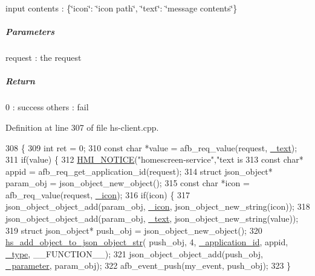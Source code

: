 input contents \+: \{\char`\"{}icon\char`\"{}\+: \char`\"{}icon path\char`\"{}, \char`\"{}text\char`\"{}\+: \char`\"{}message contents\char`\"{}\}

\subparagraph*{Parameters}


\begin{DoxyItemize}
\item request \+: the request
\end{DoxyItemize}

\subparagraph*{Return}

0 \+: success others \+: fail 

Definition at line 307 of file hs-\/client.\+cpp.


\begin{DoxyCode}
308 \{
309     \textcolor{keywordtype}{int} ret = 0;
310     \textcolor{keyword}{const} \textcolor{keywordtype}{char} *value = afb\_req\_value(request, \hyperlink{hs-client_8cpp_ad177811d47939fe9404de88672a980ab}{\_text});
311     \textcolor{keywordflow}{if}(value) \{
312         \hyperlink{include_2hmi-debug_8h_abc0d6e0760017d8ae48b836925b2ef15}{HMI\_NOTICE}(\textcolor{stringliteral}{"homescreen-service"},\textcolor{stringliteral}{"text is %
313         \textcolor{keyword}{const} \textcolor{keywordtype}{char}* appid = afb\_req\_get\_application\_id(request);
314         \textcolor{keyword}{struct }json\_object* param\_obj = json\_object\_new\_object();
315         \textcolor{keyword}{const} \textcolor{keywordtype}{char} *icon = afb\_req\_value(request, \hyperlink{hs-client_8cpp_a5476c8a51997c773220bec9fc02eeaf5}{\_icon});
316         \textcolor{keywordflow}{if}(icon) \{
317             json\_object\_object\_add(param\_obj, \hyperlink{hs-client_8cpp_a5476c8a51997c773220bec9fc02eeaf5}{\_icon}, json\_object\_new\_string(icon));
318             json\_object\_object\_add(param\_obj, \hyperlink{hs-client_8cpp_ad177811d47939fe9404de88672a980ab}{\_text}, json\_object\_new\_string(value));
319             \textcolor{keyword}{struct }json\_object* push\_obj = json\_object\_new\_object();
320             \hyperlink{hs-helper_8cpp_a8777c53f1d4d5412f19b134ad85ffedf}{hs\_add\_object\_to\_json\_object\_str}( push\_obj, 4, 
      \hyperlink{homescreen_8cpp_a6a0e1db2562b442f8131ddf64b61d1ba}{\_application\_id}, appid, \hyperlink{hs-client_8cpp_a1c24b43242df87f75631175c75afdcda}{\_type}, \_\_FUNCTION\_\_);
321             json\_object\_object\_add(push\_obj, \hyperlink{hs-client_8cpp_ae3fc16098a2461f2f1ae0ac8561437c6}{\_parameter}, param\_obj);
322             afb\_event\_push(my\_event, push\_obj);
323         \}
}
\end{DoxyCode}
